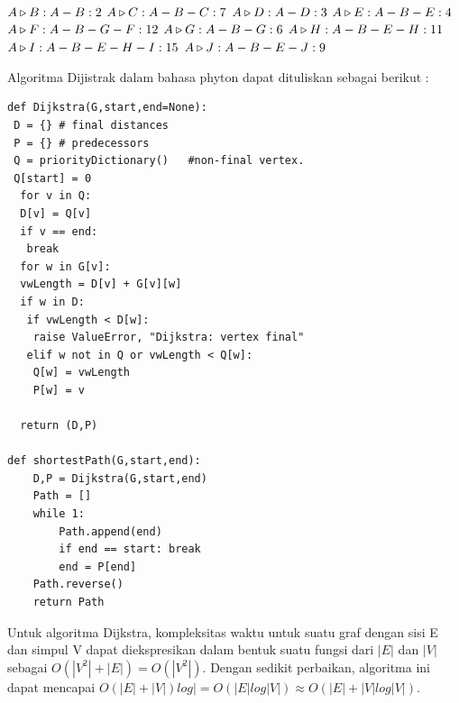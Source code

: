 \begin{enumerate}
$A \triangleright B : A - B : 2 \newline$
$A \triangleright C : A - B - C : 7 \newline$
$A \triangleright D : A - D : 3 \newline$
$A \triangleright E : A - B - E : 4 \newline$
$A \triangleright F : A - B - G - F : 12 \newline$
$A \triangleright G : A - B - G : 6 \newline$
$A \triangleright H : A - B - E - H : 11 \newline$
$A \triangleright I : A - B - E - H - I : 15 \newline$
$A \triangleright J : A - B - E - J : 9 \newline$

Algoritma Dijistrak dalam bahasa phyton dapat dituliskan sebagai berikut :

\lstset{language=Python}
\label{lst:Djistrak}
\begin{lstlisting}[frame=single]
def Dijkstra(G,start,end=None):
 D = {}	# final distances
 P = {}	# predecessors
 Q = priorityDictionary()   #non-final vertex.
 Q[start] = 0
  for v in Q:
  D[v] = Q[v]
  if v == end: 
   break
  for w in G[v]:
  vwLength = D[v] + G[v][w]
  if w in D:
   if vwLength < D[w]:
  	raise ValueError, "Dijkstra: vertex final"   
   elif w not in Q or vwLength < Q[w]:
  	Q[w] = vwLength
  	P[w] = v
		
  return (D,P)
			
def shortestPath(G,start,end):
	D,P = Dijkstra(G,start,end)
	Path = []
	while 1:
		Path.append(end)
		if end == start: break
		end = P[end]
	Path.reverse()
	return Path
\end{lstlisting}

Untuk algoritma Dijkstra, kompleksitas waktu untuk
suatu graf dengan sisi E dan simpul V dapat diekspresikan
dalam bentuk suatu fungsi dari $|E|$ dan $|V|$ sebagai $O(|V^{2}| + |E|) = O(|V^{2}|)$. Dengan sedikit perbaikan, algoritma ini dapat mencapai $O(|E| + |V|) log| =
O(|E| log|V|) ≈ O(|E| + |V| log|V|)$.
\end{enumerate}
